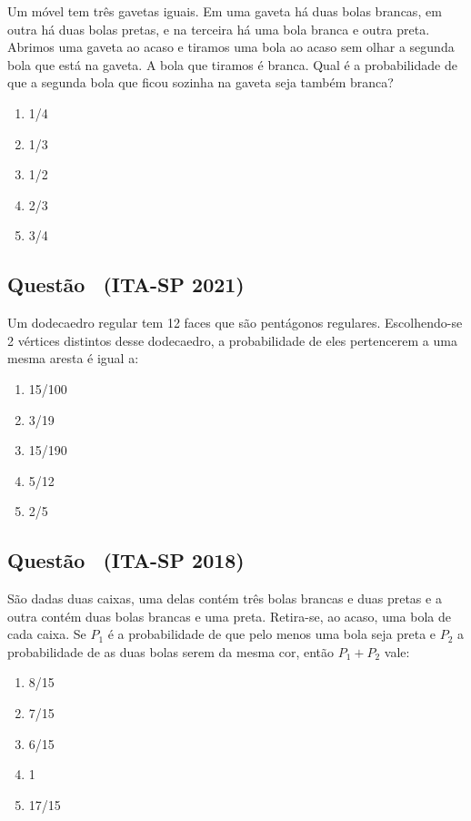 \documentclass[12pt]{article}
\newcounter{questao}
\newcommand{\novaquestao}[1]{%
  \stepcounter{questao}%
  \subsection*{Questão \thequestao\ (#1)}%
}
\begin{document}
\begin{multicols}{2}
            Um móvel tem três gavetas iguais. Em uma gaveta há duas bolas brancas, em outra há duas bolas pretas, e na terceira há uma bola 
            branca e outra preta. Abrimos uma gaveta ao acaso e tiramos uma bola ao acaso sem olhar a segunda bola que está na gaveta. 
            A bola que tiramos é branca. Qual é a probabilidade de que a segunda bola que ficou sozinha na gaveta seja também branca?

            \begin{enumerate}[label=(\alph*), noitemsep]
                \item {1}/{4}
                \item {1}/{3}
                \item {1}/{2} 
                \item {2}/{3} %
                \item {3}/{4}
            \end{enumerate}

        
        \novaquestao{ITA-SP 2021}
            
            Um dodecaedro regular tem 12 faces que são pentágonos regulares. Escolhendo-se 2 
            vértices distintos desse dodecaedro, a probabilidade de eles pertencerem a uma 
            mesma aresta é igual a:

            \begin{enumerate}[label=(\alph*), noitemsep]
                \item {15}/{100}
                \item {3}/{19}
                \item {15}/{190}
                \item {5}/{12}
                \item {2}/{5}
            \end{enumerate}
        
        \novaquestao{ITA-SP 2018}

            São dadas duas caixas, uma delas contém três bolas brancas e duas pretas e a outra
            contém duas bolas brancas e uma preta. Retira-se, ao acaso, uma bola de cada caixa. 
            Se $P_{1}$ é a probabilidade de que pelo menos uma bola seja preta e $P_{2}$ a 
            probabilidade de as duas bolas serem da mesma cor, então $P_{1}+P_{2}$ vale:


            \begin{enumerate}[label=(\alph*), noitemsep]
                \item {8}/{15}
                \item {7}/{15}
                \item {6}/{15}
                \item 1
                \item {17}/{15}
            \end{enumerate}
        

    \end{multicols}
    
\end{document}
